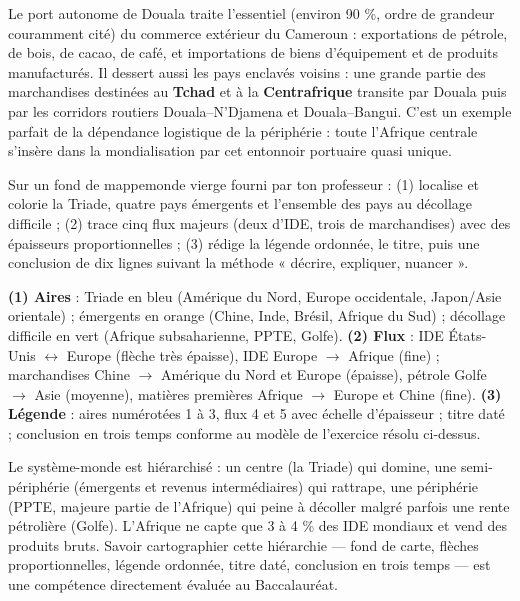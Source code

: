 \documentclass[11pt]{article}
\begin{document}
\begin{savaistu}
Le port autonome de Douala traite l'essentiel (environ 90 \%, ordre de grandeur couramment cité) du commerce extérieur du Cameroun : exportations de pétrole, de bois, de cacao, de café, et importations de biens d'équipement et de produits manufacturés. Il dessert aussi les pays enclavés voisins : une grande partie des marchandises destinées au \textbf{Tchad} et à la \textbf{Centrafrique} transite par Douala puis par les corridors routiers Douala--N'Djamena et Douala--Bangui. C'est un exemple parfait de la dépendance logistique de la périphérie : toute l'Afrique centrale s'insère dans la mondialisation par cet entonnoir portuaire quasi unique.
\end{savaistu}

\begin{exercice}
Sur un fond de mappemonde vierge fourni par ton professeur : (1) localise et colorie la Triade, quatre pays émergents et l'ensemble des pays au décollage difficile ; (2) trace cinq flux majeurs (deux d'IDE, trois de marchandises) avec des épaisseurs proportionnelles ; (3) rédige la légende ordonnée, le titre, puis une conclusion de dix lignes suivant la méthode « décrire, expliquer, nuancer ».
\end{exercice}

\begin{corrige}[Exercice]
\textbf{(1) Aires} : Triade en bleu (Amérique du Nord, Europe occidentale, Japon/Asie orientale) ; émergents en orange (Chine, Inde, Brésil, Afrique du Sud) ; décollage difficile en vert (Afrique subsaharienne, PPTE, Golfe). \textbf{(2) Flux} : IDE États-Unis $\leftrightarrow$ Europe (flèche très épaisse), IDE Europe $\to$ Afrique (fine) ; marchandises Chine $\to$ Amérique du Nord et Europe (épaisse), pétrole Golfe $\to$ Asie (moyenne), matières premières Afrique $\to$ Europe et Chine (fine). \textbf{(3) Légende} : aires numérotées 1 à 3, flux 4 et 5 avec échelle d'épaisseur ; titre daté ; conclusion en trois temps conforme au modèle de l'exercice résolu ci-dessus.
\end{corrige}

\begin{aretenir}
Le système-monde est hiérarchisé : un centre (la Triade) qui domine, une semi-périphérie (émergents et revenus intermédiaires) qui rattrape, une périphérie (PPTE, majeure partie de l'Afrique) qui peine à décoller malgré parfois une rente pétrolière (Golfe). L'Afrique ne capte que 3 à 4 \% des IDE mondiaux et vend des produits bruts. Savoir cartographier cette hiérarchie — fond de carte, flèches proportionnelles, légende ordonnée, titre daté, conclusion en trois temps — est une compétence directement évaluée au Baccalauréat.
\end{aretenir}
\end{document}
